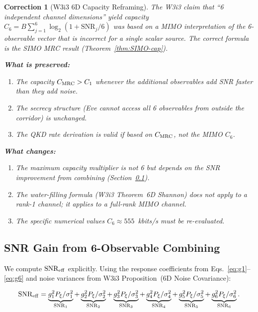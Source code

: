 \documentclass[aps,prd,twocolumn,superscriptaddress,nofootinbib]{revtex4-2}
\newcommand{\SNR}{\mathrm{SNR}}
\newtheorem{correction}{Correction}
\begin{document}
\begin{correction}[W3i3 6D Capacity Reframing]
\label{corr:6D-reframing}
The W3i3 claim that ``6 independent channel dimensions'' yield
capacity $C_6 = B \sum_{j=1}^6 \log_2(1 + \SNR_j/6)$ was based on
a MIMO interpretation of the 6-observable vector that is incorrect for
a single scalar source. The correct formula is the SIMO MRC result
(Theorem~\ref{thm:SIMO-cap}).

\medskip
\textbf{What is preserved:}
\begin{enumerate}
\item The capacity $C_{\rm MRC} > C_1$ whenever the additional observables
  add SNR faster than they add noise.
\item The secrecy structure (Eve cannot access all 6 observables from
  outside the corridor) is unchanged.
\item The QKD rate derivation is valid if based on $C_{\rm MRC}$, not
  the MIMO $C_6$.
\end{enumerate}

\textbf{What changes:}
\begin{enumerate}
\item The maximum capacity multiplier is not 6 but depends on the SNR
  improvement from combining (Section~\ref{sec:snr-gain}).
\item The water-filling formula (W3i3 Theorem~6D Shannon) does not apply
  to a rank-1 channel; it applies to a full-rank MIMO channel.
\item The specific numerical values $C_6 \approx 555$~kbits/s must be
  re-evaluated.
\end{enumerate}
\end{correction}

\subsection{SNR Gain from 6-Observable Combining}
\label{sec:snr-gain}

We compute $\SNR_{\rm eff}$ explicitly. Using the response coefficients
from Eqs.~\eqref{eq:g1}--\eqref{eq:g6} and noise variances from
W3i3 Proposition~(6D Noise Covariance):

\begin{equation}
\SNR_{\rm eff} = \underbrace{g_1^2 P_\xi/\sigma_1^2}_{\SNR_1}
+ \underbrace{g_2^2 P_\xi/\sigma_2^2}_{\SNR_2}
+ \underbrace{g_3^2 P_\xi/\sigma_3^2}_{\SNR_3}
+ \underbrace{g_4^2 P_\xi/\sigma_4^2}_{\SNR_4}
+ \underbrace{g_5^2 P_\xi/\sigma_5^2}_{\SNR_5}
+ \underbrace{g_6^2 P_\xi/\sigma_6^2}_{\SNR_6}.
\label{eq:SNR-eff-sum}
\end{equation}
\end{document}
